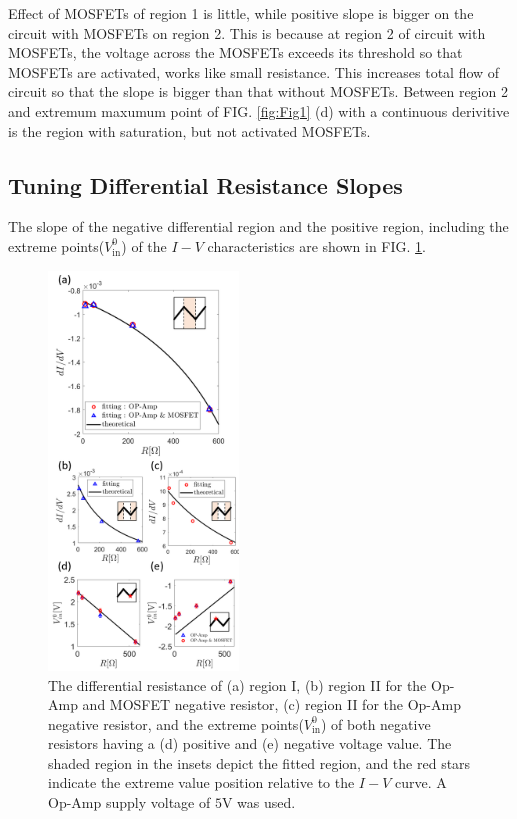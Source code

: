 \documentclass[%
 aip,
amsmath,amssymb,
reprint,
]{revtex4-1}
\begin{document}
Effect of MOSFETs of region 1 is little, while positive slope is bigger on the circuit with MOSFETs on region 2. This is because at region 2 of circuit with MOSFETs, the voltage across the MOSFETs exceeds its threshold so that MOSFETs are activated, works like small resistance. This increases total flow of circuit so that the slope is bigger than that without MOSFETs. Between region 2 and extremum maxumum point of FIG. \ref{fig:Fig1} (d) with a continuous derivitive is the region with saturation, but not activated MOSFETs.




\subsection{Tuning Differential Resistance Slopes}
The slope of the negative differential region and the positive region, including the extreme points($V_\text{in}^0$) of the $I-V$ characteristics are shown in FIG. \ref{fig:Fig2}.

\begin{figure}[!h]
  \includegraphics[width=0.45\textwidth]{figures/Fig2.png}
  \caption{The differential resistance of (a) region I, (b) region II for the Op-Amp and MOSFET negative resistor, (c) region II for the Op-Amp negative resistor, and the extreme points($V_\text{in}^{0}$) of both negative resistors having a (d) positive and (e) negative voltage value. The shaded region in the insets depict the fitted region, and the red stars indicate the extreme value position relative to the $I-V$ curve. A Op-Amp supply voltage of $5$V was used.}
  \label{fig:Fig2}
\end{figure}
\end{document}
